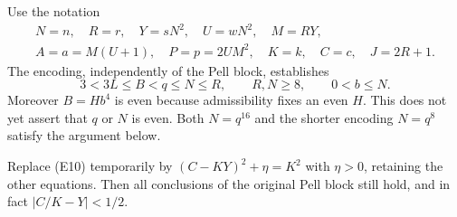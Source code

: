 Use the notation
\[
 \begin{gathered}
 N=n,\quad R=r,\quad Y=sN^2,\quad U=wN^2,\quad M=RY,\\
 A=a=M(U+1),\quad P=p=2UM^2,\quad K=k,\quad C=c,\quad J=2R+1.
 \end{gathered}
\]
The encoding, independently of the Pell block, establishes
\[
 3<3L\le B<q\le N\le R,\qquad R,N\ge8,\qquad 0<b\le N.
\]
Moreover $B=Hb^4$ is even because admissibility fixes an even $H$.
This does not yet assert that $q$ or $N$ is even. Both $N=q^{16}$ and
the shorter encoding $N=q^8$ satisfy the argument below.

\begin{lemma}\label{lem:weak-pell-rounding-new}
Replace (E10) temporarily by
$(C-KY)^2+\eta=K^2$ with $\eta>0$, retaining the other equations.
Then all conclusions of the original Pell block still hold, and in fact
$|C/K-Y|<1/2$.
\end{lemma}
